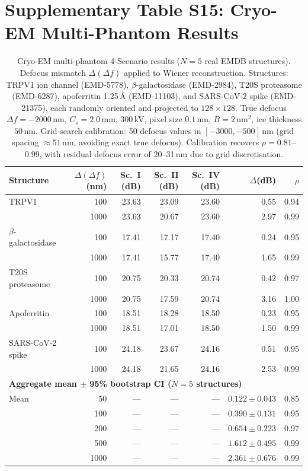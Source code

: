 \documentclass[11pt]{article}
\theoremstyle{definition}
\begin{document}
\section{Supplementary Table S15: Cryo-EM Multi-Phantom Results}
\label{sec:cryoem_scenes}

\begin{table}[htbp]
\centering
\caption{Cryo-EM multi-phantom 4-Scenario results ($N{=}5$ real EMDB structures). Defocus mismatch $\Delta(\Delta f)$ applied to Wiener reconstruction.
Structures: TRPV1 ion channel (EMD-5778), $\beta$-galactosidase (EMD-2984), T20S proteasome (EMD-6287), apoferritin 1.25\,\AA{} (EMD-11103), and SARS-CoV-2 spike (EMD-21375), each randomly oriented and projected to $128 \times 128$.
True defocus $\Delta f{=}{-}2000$\,nm, $C_s{=}2.0$\,mm, 300\,kV, pixel size $0.1$\,nm, $B{=}2$\,nm$^2$, ice thickness $50$\,nm.
Grid-search calibration: 50 defocus values in $[-3000, -500]$\,nm (grid spacing ${\approx}51$\,nm, avoiding exact true defocus).
Calibration recovers $\rho{=}0.81$--$0.99$, with residual defocus error of 20--31\,nm due to grid discretisation.}
\label{tab:cryoem_scenes}
\small
\begin{tabular}{l r r r r r r}
\toprule
Structure & $\Delta(\Delta f)$ (nm) & Sc.~I (dB) & Sc.~II (dB) & Sc.~IV (dB) & $\Delta$(dB) & $\rho$ \\
\midrule
TRPV1              & 100  & 23.63 & 23.09 & 23.60 & 0.55 & 0.94 \\
                   & 1000 & 23.63 & 20.67 & 23.60 & 2.97 & 0.99 \\
$\beta$-galactosidase & 100  & 17.41 & 17.17 & 17.40 & 0.24 & 0.95 \\
                      & 1000 & 17.41 & 15.77 & 17.40 & 1.65 & 0.99 \\
T20S proteasome    & 100  & 20.75 & 20.33 & 20.74 & 0.42 & 0.97 \\
                   & 1000 & 20.75 & 17.59 & 20.74 & 3.16 & 1.00 \\
Apoferritin        & 100  & 18.51 & 18.28 & 18.50 & 0.23 & 0.95 \\
                   & 1000 & 18.51 & 17.01 & 18.50 & 1.50 & 0.99 \\
SARS-CoV-2 spike   & 100  & 24.18 & 23.67 & 24.16 & 0.51 & 0.95 \\
                   & 1000 & 24.18 & 21.65 & 24.16 & 2.53 & 0.99 \\
\midrule
\multicolumn{7}{l}{\textbf{Aggregate mean $\pm$ 95\% bootstrap CI ($N{=}5$ structures)}} \\
\midrule
Mean    &   50 & --- & --- & --- & $0.122 \pm 0.043$ & 0.85 \\
        &  100 & --- & --- & --- & $0.390 \pm 0.131$ & 0.95 \\
        &  200 & --- & --- & --- & $0.654 \pm 0.223$ & 0.97 \\
        &  500 & --- & --- & --- & $1.612 \pm 0.495$ & 0.99 \\
        & 1000 & --- & --- & --- & $2.361 \pm 0.676$ & 0.99 \\
\bottomrule
\end{tabular}
\end{table}
\end{document}
